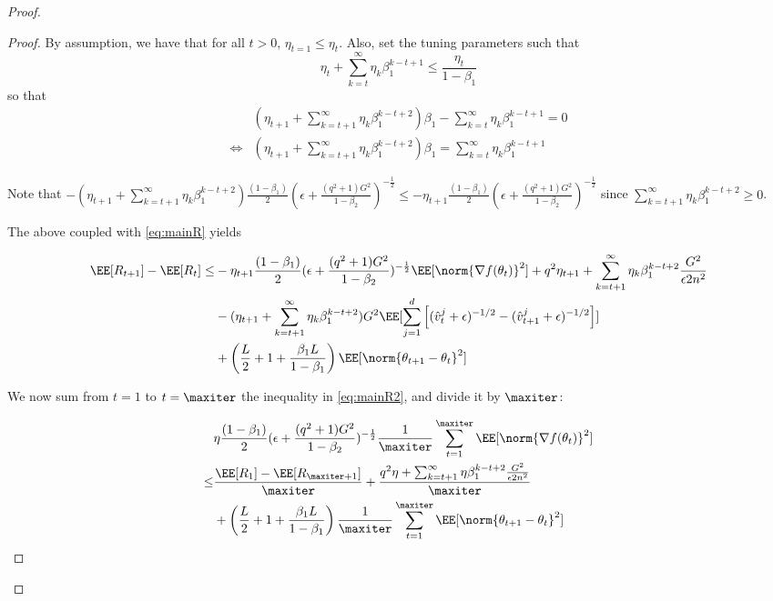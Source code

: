 \documentclass[11pt]{article}
\begin{document}
\begin{proof}
\begin{proof}
By assumption, we have that for all $t >0$, $\eta_{t=1} \leq \eta_t$.
Also, set the tuning parameters such that
\begin{equation}
 \eta_{t}+ \sum_{k=t}^\infty \eta_{k} \beta_1^{k-t+1} \leq \frac{\eta_t}{1 - \beta_1}
 \end{equation}
 so that 
\begin{equation}
\begin{split}
& (\eta_{t+1} + \sum_{k=t+1}^\infty \eta_{k} \beta_1^{k-t+2}) \beta_1- \sum_{k=t}^\infty \eta_{k} \beta_1^{k-t+1} = 0\\
\iff& (\eta_{t+1} + \sum_{k=t+1}^\infty \eta_{k} \beta_1^{k-t+2}) \beta_1 = \sum_{k=t}^\infty \eta_{k} \beta_1^{k-t+1}
\end{split}
\end{equation}

Note that $- (\eta_{t+1}+ \sum_{k=t+1}^\infty \eta_{k} \beta_1^{k-t+2})\frac{(1-\beta_1)}{2}  (\epsilon + \frac{(q^2+1)G^2}{1 - \beta_2})^{-\frac{1}{2}}\leq - \eta_{t+1}\frac{(1-\beta_1)}{2} (\epsilon + \frac{(q^2+1)G^2}{1 - \beta_2})^{-\frac{1}{2}}$ since $ \sum_{k=t+1}^\infty \eta_{k} \beta_1^{k-t+2} \geq 0$.

The above coupled with \eqref{eq:mainR} yields

\begin{equation}\label{eq:mainR2}
\begin{split}
\EE[R_{t+1}] - \EE[R_t] \leq & - \eta_{t+1}\frac{(1-\beta_1)}{2} (\epsilon + \frac{(q^2+1)G^2}{1 - \beta_2})^{-\frac{1}{2}} \EE[\norm{\nabla f(\theta_t)}^2]+q^2 \eta_{t+1}+ \sum_{k=t+1}^\infty \eta_{k} \beta_1^{k-t+2}\frac{G^2 }{\epsilon 2n^2}\\
&  -  (\eta_{t+1}+ \sum_{k=t+1}^\infty \eta_{k} \beta_1^{k-t+2}) G^2 \EE[\sum_{j=1}^d \left[(\hat{v}^j_{t} + \epsilon )^{-1/2} - (\hat{v}^j_{t+1} + \epsilon )^{-1/2}  \right] ]\\
& + \left(\frac{L}{2} + 1+ \frac{\beta_1L}{1-\beta_1} \right)  \EE[ \norm{\theta_{t+1} - \theta_{t}}^2]
\end{split}
\end{equation}

We now sum from $t = 1$ to $t = \maxiter$  the inequality in \eqref{eq:mainR2}, and divide it by $\maxiter$:

\begin{equation}\label{eq:finalR2}
\begin{split}
&\eta\frac{(1-\beta_1)}{2} (\epsilon + \frac{(q^2+1)G^2}{1 - \beta_2})^{-\frac{1}{2}} \frac{1}{\maxiter}\sum_{t=1}^{\maxiter} \EE[\norm{\nabla f(\theta_t)}^2] \\
\leq & \frac{\EE[R_1] - \EE[R_{\maxiter+1}]}{\maxiter} + \frac{q^2 \eta+ \sum_{k=t+1}^\infty \eta \beta_1^{k-t+2}\frac{G^2 }{\epsilon 2n^2}}{\maxiter}\\
& + \left(\frac{L}{2} + 1+ \frac{\beta_1L}{1-\beta_1} \right)\frac{1}{\maxiter}  \sum_{t=1}^{\maxiter}\EE[ \norm{\theta_{t+1} - \theta_{t}}^2]
\end{split}
\end{equation}


\end{proof}
\end{proof}
\end{document}
